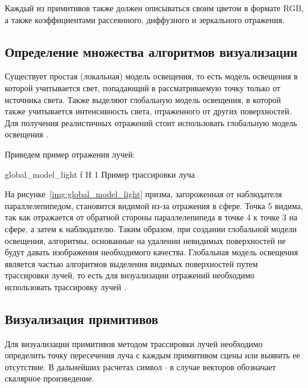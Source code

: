 Каждый из примитивов также должен описываться своим цветом в формате RGB, а также
коэффициентами рассеянного, диффузного и зеркального отражения.



\subsection{Определение множества алгоритмов визуализации}
Существует простая (локальная) модель освещения, то есть модель освещения в которой учитывается свет, попадающий в рассматриваемую точку только от источника света. Также выделяют глобальную модель освещения,  в которой также учитывается интенсивность света, отраженного от других поверхностей.
Для получения реалистичных отражений стоит использовать глобальную модель освещения \cite{Rodgers}. 

Приведем пример отражения лучей:

{global_model_light} %
{f} %
{H} %
{1\textwidth} %
{Пример трассировки луча} %



На рисунке~\ref{img:global_model_light}  призма, загороженная от наблюдателя параллелепипедом, становится видимой из-за отражения в сфере.
Точка 5 видима, так как отражается от обратной стороны параллелепипеда в точке 4 к точке 3 на сфере, а затем к наблюдателю.
Таким образом, при создании глобальной модели освещения, алгоритмы, основанные на удалении невидимых поверхностей не будут давать изображения необходимого качества.
Глобальная модель освещения является частью алгоритмов выделения видимых поверхностей путем трассировки лучей, то есть для визуализации отражений необходимо использовать трассировку лучей \cite{Rodgers}.

\subsection{Визуализация примитивов}
Для визуализации примитивов методом трассировки лучей необходимо определить точку пересечения луча с каждым примитивом сцены или выявить ее отсутствие. В дальнейших расчетах символ $\cdot$ в случае векторов обозначает скалярное произведение.

